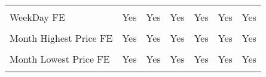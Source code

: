 \documentclass[border=0.2cm]{standalone}
\begin{document}
\begin{tabular}{lcccccc}
    \vspace{4pt}           &                                                &                                                &                                                &                                                 &                                                &                                                \\
    WeekDay FE             & Yes                                            & Yes                                            & Yes                                            & Yes                                             & Yes                                            & Yes                                            \\
    \vspace{4pt}           &                                                &                                                &                                                &                                                 &                                                &                                                \\
    Month Highest Price FE & Yes                                            & Yes                                            & Yes                                            & Yes                                             & Yes                                            & Yes                                            \\
    \vspace{4pt}           &                                                &                                                &                                                &                                                 &                                                &                                                \\
    Month Lowest Price FE  & Yes                                            & Yes                                            & Yes                                            & Yes                                             & Yes                                            & Yes                                            \\
    \vspace{4pt}           &                                                &                                                &                                                &                                                 &                                                &                                                \\

\end{tabular}
\end{document}
